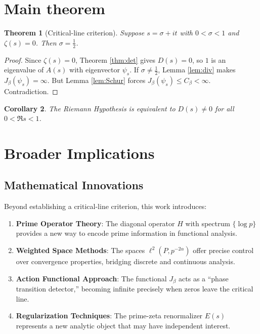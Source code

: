 \documentclass[12pt]{article}
\newtheorem{theorem}{Theorem}[section]
\newtheorem{corollary}[theorem]{Corollary}
\theoremstyle{definition}
\theoremstyle{remark}
\newcommand{\Zeta}{\zeta}
\begin{document}
\section{Main theorem}

\begin{theorem}[Critical-line criterion]\label{thm:main}
Suppose \(s=\sigma+it\) with \(0<\sigma<1\) and \(\Zeta(s)=0\).
Then \(\sigma=\tfrac12\).
\end{theorem}

\begin{proof}
Since \(\Zeta(s)=0\), Theorem \ref{thm:det} gives \(D(s)=0\), so
\(1\) is an eigenvalue of \(A(s)\) with eigenvector \(\psi_s\).
If \(\sigma\ne\tfrac12\), Lemma \ref{lem:div} makes
\(J_\beta(\psi_s)=\infty\).
But Lemma \ref{lem:Schur} forces \(J_\beta(\psi_s)\le C_\beta<\infty\).
Contradiction.
\end{proof}

\begin{corollary}
The Riemann Hypothesis is equivalent to  
\(D(s)\neq0\) for all \(0<\Re s<1\).
\end{corollary}

\section{Broader Implications}

\subsection{Mathematical Innovations}

Beyond establishing a critical-line criterion, this work introduces:

\begin{enumerate}
\item \textbf{Prime Operator Theory}: The diagonal operator $H$ with spectrum 
$\{\log p\}$ provides a new way to encode prime information in functional analysis.

\item \textbf{Weighted Space Methods}: The spaces $\ell^2(P, p^{-2\alpha})$ 
offer precise control over convergence properties, bridging discrete and 
continuous analysis.

\item \textbf{Action Functional Approach}: The functional $J_\beta$ acts as a 
``phase transition detector,'' becoming infinite precisely when zeros leave the 
critical line.

\item \textbf{Regularization Techniques}: The prime-zeta renormalizer $E(s)$ 
represents a new analytic object that may have independent interest.
\end{enumerate}
\end{document}
